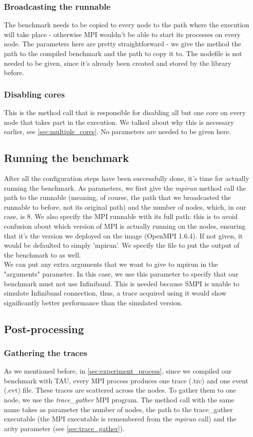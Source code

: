 \subsubsection{Broadcasting the runnable}
The benchmark needs to be copied to every node to the path where the
execution will take place - otherwise MPI wouldn't be able to start
its processes on every node. The parameters here are pretty
straightforward - we give the method the path to the compiled
benchmark and the path to copy it to. The nodefile is not needed to be
given, since it's already been created and stored by the library
before.
\subsubsection{Disabling cores}
This is the method call that is responsible for disabling all but one
core on every node that takes part in the execution. We talked about
why this is necessary earlier, see \ref{sec:multiple_cores}. No
parameters are needed to be given here.
\subsection{Running the benchmark}
After all the configuration steps have been successfully done, it's
time for actually running the benchmark. As parameters, we first give
the \emph{mpirun} method call the path to the runnable (meaning, of
course, the path that we broadcasted the runnable to before, not its
original path) and the number of nodes, which, in our case, is 8. We
also specify the MPI runnable with its full path: this is to avoid
confusion about which version of MPI is actually running on the nodes,
ensuring that it's the version we deployed on the image (OpenMPI
1.6.4). If not given, it would be defaulted to simply 'mpirun'. We
specify the file to put the output of the benchmark to as well.\\
We can put any extra arguments that we want to give to mpirun in the
"arguments" parameter. In this case, we use this parameter to specify
that our benchmark must not use Infiniband. This is needed because
SMPI is unable to simulate Infiniband connection, thus, a trace
acquired using it would show significantly better performance than the
simulated version.
\subsection{Post-processing}
\subsubsection{Gathering the traces}
As we mentioned before, in \ref{sec:experiment_process}, since we
compiled our benchmark with TAU, every MPI process produces
one trace (.trc) and one event (.evt) file. These traces are scattered
across the nodes. To gather them to one node, we use
the \emph{trace\_gather} MPI program. The method call with the same
name takes as parameter the number of nodes, the path to
the trace\_gather executable (the MPI executable is remembered
from the \emph{mpirun} call) and the arity parameter
(see \ref{sec:trace_gather}).
